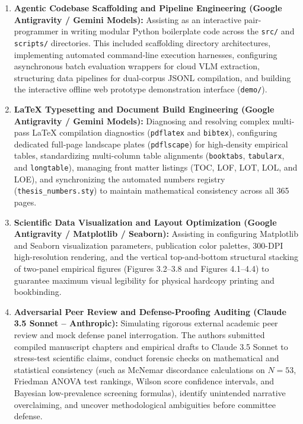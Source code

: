 \begin{enumerate}[leftmargin=2.0em, itemsep=5pt]
    \item \textbf{Agentic Codebase Scaffolding and Pipeline Engineering (Google Antigravity / Gemini Models):} 
    Assisting as an interactive pair-programmer in writing modular Python boilerplate code across the \texttt{src/} and \texttt{scripts/} directories. This included scaffolding directory architectures, implementing automated command-line execution harnesses, configuring asynchronous batch evaluation wrappers for cloud VLM extraction, structuring data pipelines for dual-corpus JSONL compilation, and building the interactive offline web prototype demonstration interface (\texttt{demo/}).
    
    \item \textbf{LaTeX Typesetting and Document Build Engineering (Google Antigravity / Gemini Models):} 
    Diagnosing and resolving complex multi-pass LaTeX compilation diagnostics (\texttt{pdflatex} and \texttt{bibtex}), configuring dedicated full-page landscape plates (\texttt{pdflscape}) for high-density empirical tables, standardizing multi-column table alignments (\texttt{booktabs}, \texttt{tabularx}, and \texttt{longtable}), managing front matter listings (TOC, LOF, LOT, LOL, and LOE), and synchronizing the automated numbers registry (\texttt{thesis\_numbers.sty}) to maintain mathematical consistency across all 365 pages.
    
    \item \textbf{Scientific Data Visualization and Layout Optimization (Google Antigravity / Matplotlib / Seaborn):} 
    Assisting in configuring Matplotlib and Seaborn visualization parameters, publication color palettes, 300-DPI high-resolution rendering, and the vertical top-and-bottom structural stacking of two-panel empirical figures (Figures 3.2--3.8 and Figures 4.1--4.4) to guarantee maximum visual legibility for physical hardcopy printing and bookbinding.
    
    \item \textbf{Adversarial Peer Review and Defense-Proofing Auditing (Claude 3.5 Sonnet -- Anthropic):} 
    Simulating rigorous external academic peer review and mock defense panel interrogation. The authors submitted compiled manuscript chapters and empirical drafts to Claude 3.5 Sonnet to stress-test scientific claims, conduct forensic checks on mathematical and statistical consistency (such as McNemar discordance calculations on $N=53$, Friedman ANOVA test rankings, Wilson score confidence intervals, and Bayesian low-prevalence screening formulas), identify unintended narrative overclaiming, and uncover methodological ambiguities before committee defense.
    

\end{enumerate}

